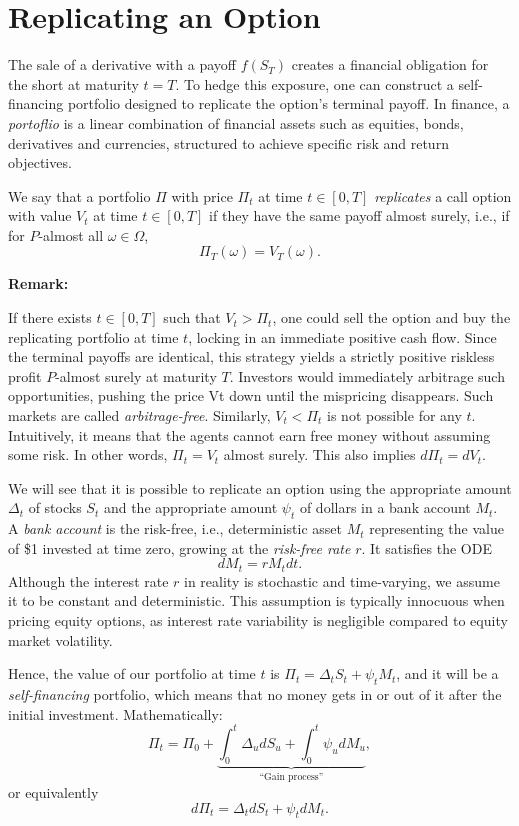 \documentclass{article}
\newenvironment{importantremark}{%
    \begin{mdframed}[topline=false, bottomline=false, rightline=false, linewidth=2pt, linecolor=gray!50, innerleftmargin=10pt]%
    \textbf{Remark:} %
}{%
    \end{mdframed}%
}
\theoremstyle{definition}
\theoremstyle{remark}
\begin{document}
\section{Replicating an Option}
The sale of a derivative with a payoff $f(S_T)$ creates a financial obligation for the short at maturity $t=T$. To hedge this exposure, one can construct a self-financing portfolio designed to replicate the option's terminal payoff. In finance, a \textit{portoflio} is a linear combination of financial assets such as equities, bonds, derivatives and currencies, structured to achieve specific risk and return objectives.
        
We say that a portfolio $\Pi$ with price $\Pi_t$ at time $t\in[0,T]$ \textit{replicates} a call option with value $V_t$ at time $t\in[0,T]$ if they have the same payoff almost surely, i.e., if for $P$-almost all $\omega\in\Omega$,\[
\Pi_T(\omega)=V_T(\omega).
    \]

\begin{importantremark}
If there exists $t \in [0,T]$ such that $V_t > \Pi_t$, one could sell the option and buy the replicating portfolio at time $t$, locking in an immediate positive cash flow. Since the terminal payoffs are identical, this strategy yields a strictly positive riskless profit $P$-almost surely at maturity $T$. Investors would immediately arbitrage such opportunities, pushing the price Vt down until the mispricing disappears. Such markets are called \textit{arbitrage-free}. Similarly, $V_t< \Pi_t$ is not possible for any $t$. Intuitively, it means that the agents cannot earn free money without assuming some risk. In other words, $\Pi_t=V_t$ almost surely. This also implies $d\Pi_t=dV_t$.\end{importantremark}


We will see that it is possible to replicate an option using the appropriate amount $\Delta_t$ of stocks $S_t$ and the appropriate amount $\psi_t$ of dollars in a bank account $M_t$. A \textit{bank account} is the risk-free, i.e., deterministic asset $M_t$ representing the value of \$1 invested at time zero, growing at the \textit{risk-free rate} $r$. It satisfies the ODE\[
    dM_t=rM_tdt.
\]
Although the interest rate $r$ in reality is stochastic and time-varying, we assume it to be constant and deterministic. This assumption is typically innocuous when pricing equity options, as interest rate variability is negligible compared to equity market volatility.

 Hence, the value of our portfolio at time $t$ is $\Pi_t=\Delta_t S_t + \psi_t M_t$, and it will be a \textit{self-financing} portfolio, which means that no money gets in or out of it after the initial investment. Mathematically:\[
    \Pi_t =\Pi_0 + \underbrace{\int_0^t\Delta_udS_u+\int_0^t \psi_udM_u}_{\text{``Gain process''}},
    \]or equivalently\[
    d\Pi_t = \Delta_t dS_t+\psi_t dM_t.
    \] 
\end{document}
